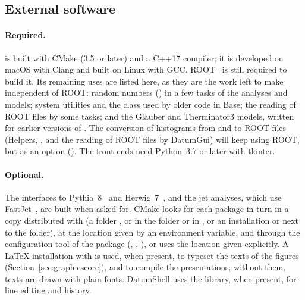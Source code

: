 \subsection{External software}
\label{sec:external}

\paragraph{Required.}
\Datum{} is built with CMake (3.5 or later) and a C++17 compiler; it is developed on macOS with Clang and built on Linux
with GCC. ROOT~\cite{Brun:1997pa} is still required to build it. Its remaining uses are listed here, as they are
the work left to make \Datum{} independent of ROOT: random numbers () in a few tasks of the analyses and
models; system utilities and the  class used by older code in Base; the reading of ROOT files by some
tasks; and the Glauber and Therminator3 models, written for earlier versions of \Datum{}. The conversion of
histograms from and to ROOT files (Helpers, , and the reading of ROOT files by DatumGui) will keep
using ROOT, but as an option (). The front ends need Python~3.7 or later with tkinter.

\paragraph{Optional.}
The interfaces to Pythia~8~\cite{Bierlich:2022pfr} and Herwig~7~\cite{Bellm:2015jjp}, and the jet analyses, which
use FastJet~\cite{Cacciari:2011ma}, are built when asked for. CMake looks for each package in turn in a copy
distributed with \Datum{} (a folder ,  or  in the \Datum{} folder or in
, or an installation  or  next to the \Datum{} folder),
at the location given by an environment variable, and through the configuration tool of the package
(, , ), or uses the location given explicitly. A LaTeX installation with  is used, when
present, to typeset the texts of the figures (Section~\ref{sec:graphicscore}), and  to compile the
presentations; without them, texts are drawn with plain fonts. DatumShell uses the  library, when
present, for line editing and history.

